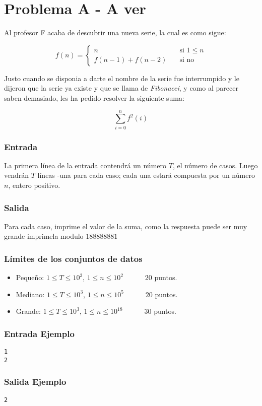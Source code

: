 \chapter*{Problema A - A ver}
Al profesor F acaba de descubrir una nueva serie, la cual es como sigue:

\[   
f(n) = 
     \begin{cases}
       n &\quad \text{si } 1 \leq n \\
       f(n - 1) + f(n-2) &\quad \text{si no}
     \end{cases}
\]

Justo cuando se disponia a darte el nombre de la serie fue interrumpido y le dijeron que la serie ya existe y que se llama de \textit{Fibonacci}, y como al parecer saben demasiado, les ha pedido resolver la siguiente suma:

$$ \sum_{i=0}^n f^2(i) $$

\subsection*{Entrada}
La primera línea de la entrada contendrá un número $T$, el número de casos. Luego vendrán $T$ líneas -una para
cada caso; cada una estará compuesta por un número $n$,
entero positivo.

\subsection*{Salida}
Para cada caso, imprime el valor de la suma, como la respuesta puede ser muy grande imprimela modulo $188888881$

\subsection*{Límites de los conjuntos de datos}

\begin{itemize}
    \item Pequeño: $ 1 \leq T \leq 10^3$, $ 1 \leq n \leq 10^2$   $\quad \;\;\;\;\;$ $20$ puntos.
    \item Mediano: $ 1 \leq T \leq 10^3$, $ 1 \leq n \leq 10^5$   $\quad \;\;\;\;\;$ $20$ puntos.
    \item Grande: $ 1 \leq T \leq 10^3$, $ 1 \leq n \leq 10^{18}$   $\quad \;\;\;\;\;$ $30$ puntos.
\end{itemize}

\begin{multicols}{2}
\subsection*{Entrada Ejemplo}

\begin{verbatim}
1
2
\end{verbatim}

\columnbreak

\subsection*{Salida Ejemplo}
\begin{verbatim}
2
\end{verbatim}
\end{multicols}


